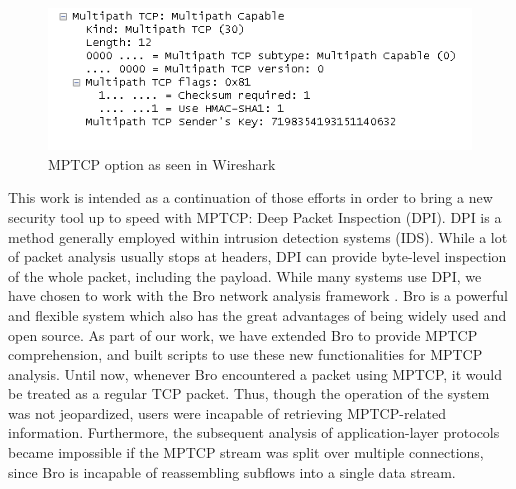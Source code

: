 \begin{figure}[!t]
\centering
\includegraphics[width=\columnwidth]{Figures/wiresharkdemo.png}
\caption{MPTCP option as seen in Wireshark}
\label{pic:wshark demo}
\end{figure}

This work is intended as a continuation of those efforts in order to bring a new security tool up to speed with MPTCP: Deep Packet Inspection (DPI). DPI is a method generally employed within intrusion detection systems (IDS). While a lot of packet analysis usually stops at headers, DPI can provide byte-level inspection of the whole packet, including the payload. While many systems use DPI, we have chosen to work with the Bro network analysis framework \cite{bro}. Bro is a powerful and flexible system which also has the great advantages of being widely used and open source. As part of our work, we have extended Bro to provide MPTCP comprehension, and built scripts to use these new functionalities for MPTCP analysis. Until now, whenever Bro encountered a packet using MPTCP, it would be treated as a regular TCP packet. Thus, though the operation of the system was not jeopardized, users were incapable of retrieving MPTCP-related information. Furthermore, the subsequent analysis of application-layer protocols became impossible if the MPTCP stream was split over multiple connections, since Bro is incapable of reassembling subflows into a single data stream. \\

